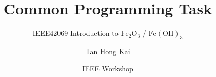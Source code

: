 \title{Common Programming Task}
\subtitle{IEEE42069 Introduction to \ensuremath{\mathrm{Fe_{2}O_{3}}} / \ensuremath{\mathrm{Fe{(OH)}_{3}}}}

\author[]{Tan Hong Kai}


\date[]{IEEE Workshop}

\subject{Programming}




